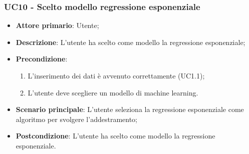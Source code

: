 \subsubsection{UC10 - Scelto modello regressione esponenziale}
\label{sssec:uc10}
\begin{itemize}
  \item \textbf{Attore primario}: Utente;
  \item \textbf{Descrizione}: L'utente ha scelto come modello la regressione esponenziale;
  \item \textbf{Precondizione}:
  \begin{enumerate}
    \item L'inserimento dei dati è avvenuto correttamente (UC1.1);
    \item L'utente deve scegliere un modello di machine learning.
  \end{enumerate}
  \item \textbf{Scenario principale}: L'utente seleziona la regressione esponenziale come algoritmo per svolgere l'addestramento;
  \item \textbf{Postcondizione}: L'utente ha scelto come modello la regressione esponenziale.
\end{itemize}
